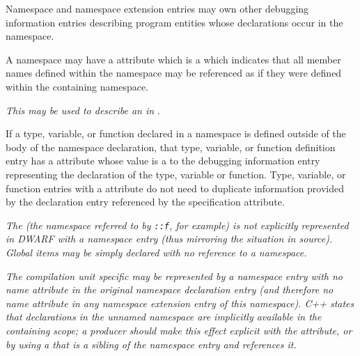 Namespace and namespace extension entries may own 
other
debugging information entries describing program entities
whose declarations occur in the namespace.

A namespace may have a 
\DWATexportsymbolsDEFN{}
attribute
which is a \CLASSflag{} which
indicates that all member names defined within the 
namespace may be referenced as if they were defined within 
the containing namespace. 

\textit{This may be used to describe an  in }.

If a type, variable, or function declared in a namespace is
defined outside of the body of the namespace declaration,
that type, variable, or function definition entry has a
\DWATspecification{} attribute 
whose value is a  to the
debugging information entry representing the declaration of
the type, variable or function. Type, variable, or function
entries with a 
\DWATspecification{} attribute 
do not need
to duplicate information provided by the declaration entry
referenced by the specification attribute.

\textit{The  
(the 
namespace 
referred to by
\texttt{::f}, for example) is not explicitly represented in
DWARF with a namespace entry (thus mirroring the situation
in  source).  
Global items may be simply declared with no
reference to a namespace.}

\textit{The  
compilation unit specific  may
be represented by a namespace entry with no name attribute in
the original namespace declaration entry (and therefore no name
attribute in any namespace extension entry of this namespace).
\bb
C++ states that declarations in the unnamed namespace are
implicitly available in the containing scope; a producer
should make this effect explicit with the \DWATexportsymbols{}
attribute, or by using a \DWTAGimportedmodule{} that is a
sibling of the namespace entry and references it.
\eb
}

